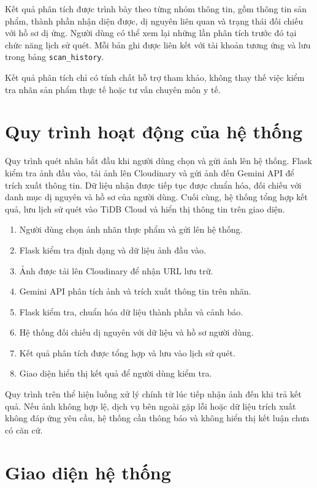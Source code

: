 Kết quả phân tích được trình bày theo từng nhóm thông tin, gồm thông tin sản phẩm, thành phần nhận diện được, dị nguyên liên quan và trạng thái đối chiếu với hồ sơ dị ứng. Người dùng có thể xem lại những lần phân tích trước đó tại chức năng lịch sử quét. Mỗi bản ghi được liên kết với tài khoản tương ứng và lưu trong bảng \texttt{scan\_history}.

Kết quả phân tích chỉ có tính chất hỗ trợ tham khảo, không thay thế việc kiểm tra nhãn sản phẩm thực tế hoặc tư vấn chuyên môn y tế.

\section{Quy trình hoạt động của hệ thống}

Quy trình quét nhãn bắt đầu khi người dùng chọn và gửi ảnh lên hệ thống. Flask kiểm tra ảnh đầu vào, tải ảnh lên Cloudinary và gửi ảnh đến Gemini API để trích xuất thông tin. Dữ liệu nhận được tiếp tục được chuẩn hóa, đối chiếu với danh mục dị nguyên và hồ sơ của người dùng. Cuối cùng, hệ thống tổng hợp kết quả, lưu lịch sử quét vào TiDB Cloud và hiển thị thông tin trên giao diện.

\begin{enumerate}
	\item Người dùng chọn ảnh nhãn thực phẩm và gửi lên hệ thống.
	\item Flask kiểm tra định dạng và dữ liệu ảnh đầu vào.
	\item Ảnh được tải lên Cloudinary để nhận URL lưu trữ.
	\item Gemini API phân tích ảnh và trích xuất thông tin trên nhãn.
	\item Flask kiểm tra, chuẩn hóa dữ liệu thành phần và cảnh báo.
	\item Hệ thống đối chiếu dị nguyên với dữ liệu và hồ sơ người dùng.
	\item Kết quả phân tích được tổng hợp và lưu vào lịch sử quét.
	\item Giao diện hiển thị kết quả để người dùng kiểm tra.
\end{enumerate}

Quy trình trên thể hiện luồng xử lý chính từ lúc tiếp nhận ảnh đến khi trả kết quả. Nếu ảnh không hợp lệ, dịch vụ bên ngoài gặp lỗi hoặc dữ liệu trích xuất không đáp ứng yêu cầu, hệ thống cần thông báo và không hiển thị kết luận chưa có căn cứ.

\section{Giao diện hệ thống}

